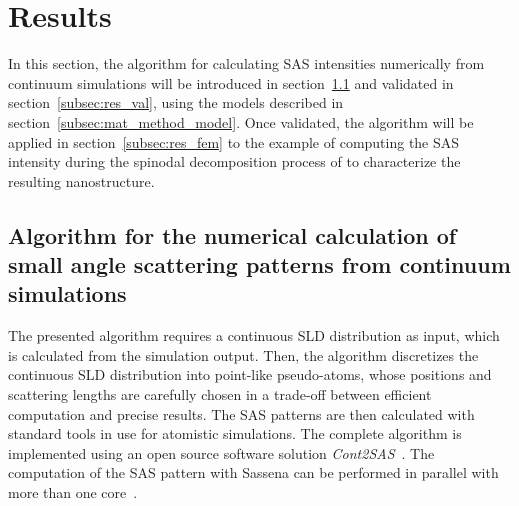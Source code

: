 \documentclass[preprint, 5p, times, twocolumn]{elsarticle}
\begin{document}
\section{Results}
\label{sec:res}

In this section, the algorithm for calculating SAS intensities numerically from continuum simulations will be introduced in section~\ref{subsec:res_algo} and validated in section~\ref{subsec:res_val}, using the models described in section~\ref{subsec:mat_method_model}. Once validated, the algorithm will be applied in section~\ref{subsec:res_fem} to the example of computing the SAS intensity during the spinodal decomposition process of  to characterize the resulting nanostructure.

\subsection{Algorithm for the numerical calculation of small angle scattering patterns from continuum simulations}
\label{subsec:res_algo}

The presented algorithm requires a continuous SLD distribution as input, which is calculated from the simulation output. Then, the algorithm discretizes the continuous SLD distribution into point-like pseudo-atoms, whose positions and scattering lengths are carefully chosen in a trade-off between efficient computation and precise results. The SAS patterns are then calculated with standard tools in use for atomistic simulations. The complete algorithm is implemented using an open source software solution \emph{Cont2SAS}~\cite{cont2sas}. The computation of the SAS pattern with Sassena can be performed in parallel with more than one core~\cite{lindner2012sassena, majumdar2024computation}.
\end{document}
